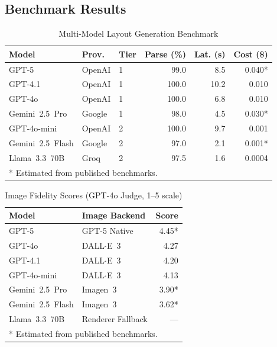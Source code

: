 \documentclass[journal]{IEEEtran}
\begin{document}
\subsection{Benchmark Results}

\begin{table}[t]
\centering
\caption{Multi-Model Layout Generation Benchmark}
\label{tab:model_bench}
\scriptsize
\setlength{\tabcolsep}{4pt}
\renewcommand{\arraystretch}{1.2}
\begin{tabular}{lllrrr}
\toprule
\textbf{Model} & \textbf{Prov.} & \textbf{Tier}
              & \textbf{Parse (\%)} & \textbf{Lat. (s)}
              & \textbf{Cost (\$)} \\
\midrule
GPT-5            & OpenAI & 1 & 99.0 &  8.5 & 0.040* \\
GPT-4.1          & OpenAI & 1 & 100.0 & 10.2 & 0.010 \\
GPT-4o           & OpenAI & 1 & 100.0 &  6.8 & 0.010 \\
Gemini~2.5~Pro   & Google & 1 & 98.0 &  4.5 & 0.030* \\
GPT-4o-mini      & OpenAI & 2 & 100.0 &  9.7 & 0.001 \\
Gemini~2.5~Flash & Google & 2 & 97.0 &  2.1 & 0.001* \\
Llama~3.3~70B    & Groq   & 2 & 97.5 &  1.6 & 0.0004 \\
\bottomrule
\multicolumn{6}{l}{* Estimated from published benchmarks.}
\end{tabular}
\end{table}

\begin{table}[t]
\centering
\caption{Image Fidelity Scores (GPT-4o Judge, 1--5 scale)}
\label{tab:img_fidelity}
\scriptsize
\setlength{\tabcolsep}{4pt}
\renewcommand{\arraystretch}{1.2}
\begin{tabular}{llr}
\toprule
\textbf{Model} & \textbf{Image Backend} & \textbf{Score} \\
\midrule
GPT-5            & GPT-5 Native          & 4.45* \\
GPT-4o           & DALL$\cdot$E~3        & 4.27  \\
GPT-4.1          & DALL$\cdot$E~3        & 4.20  \\
GPT-4o-mini      & DALL$\cdot$E~3        & 4.13  \\
Gemini~2.5~Pro   & Imagen~3              & 3.90* \\
Gemini~2.5~Flash & Imagen~3              & 3.62* \\
Llama~3.3~70B    & Renderer Fallback     & --- \\
\bottomrule
\multicolumn{3}{l}{* Estimated from published benchmarks.}
\end{tabular}
\end{table}
\end{document}
